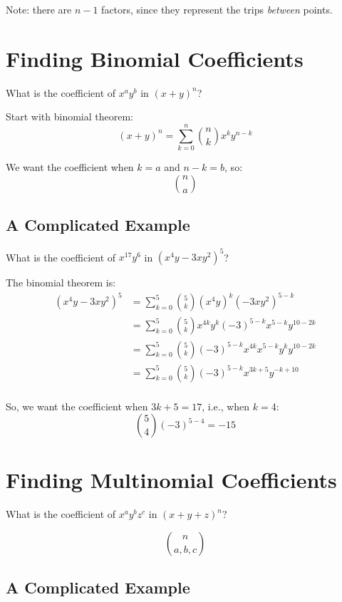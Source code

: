 \documentclass{article}
\begin{document}
    Note: there are $n - 1$ factors, since they represent the trips \textit{between} points.

    \section{Finding Binomial Coefficients}

    What is the coefficient of $x^ay^b$ in $(x + y)^n$?
    
    Start with binomial theorem: \begin{equation}
        (x + y)^n = \sum_{k = 0}^n{{n \choose k}x^ky^{n - k}}
    \end{equation}

    We want the coefficient when $k = a$ and $n - k = b$, so: $${n \choose a}$$

    \subsection{A Complicated Example}

    What is the coefficient of $x^{17}y^6$ in $(x^4y - 3xy^2)^5$?

    The binomial theorem is: \begin{align*}
        (x^4y - 3xy^2)^5 & = \sum_{k = 0}^5{{5 \choose k}(x^4y)^k(-3xy^2)^{5 - k}} \\
        & = \sum_{k = 0}^5{{5 \choose k}x^{4k}y^k(-3)^{5 - k}x^{5 - k}y^{10 - 2k}} \\
        & = \sum_{k = 0}^5{{5 \choose k}(-3)^{5 - k}x^{4k}x^{5 - k}y^ky^{10 - 2k}} \\
        & = \sum_{k = 0}^5{{5 \choose k}(-3)^{5 - k}x^{3k + 5}y^{-k + 10}} \\
    \end{align*}

    So, we want the coefficient when $3k + 5 = 17$, i.e., when $k = 4$: \begin{equation}
        {5 \choose 4}(-3)^{5 - 4} = -15
    \end{equation}

    \section{Finding Multinomial Coefficients}

    What is the coefficient of $x^ay^bz^c$ in $(x + y + z)^n$?
    
    $${n \choose a, b, c}$$

    \subsection{A Complicated Example}
\end{document}
